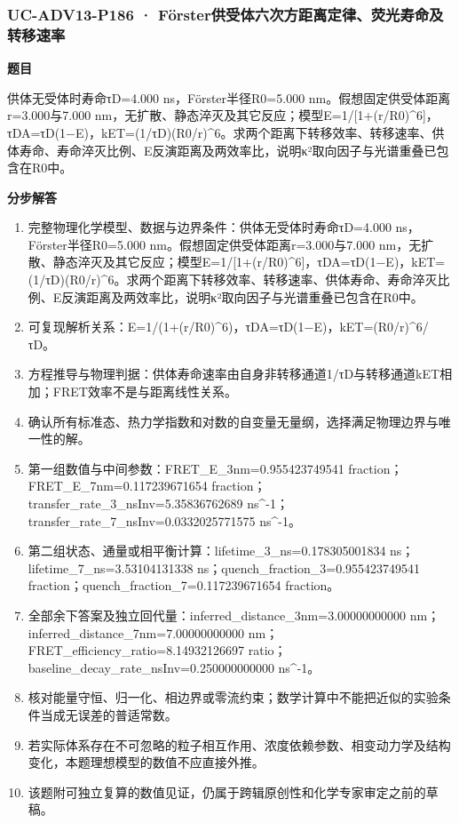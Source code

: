 \documentclass[UTF8,11pt,a4paper]{ctexart}
\begin{document}
\subsubsection*{UC-ADV13-P186 · Förster供受体六次方距离定律、荧光寿命及转移速率}
\noindent\textbf{题目}\par
供体无受体时寿命τD=4.000 ns，Förster半径R0=5.000 nm。假想固定供受体距离r=3.000与7.000 nm，无扩散、静态淬灭及其它反应；模型E=1/[1+(r/R0)\textasciicircum{}6]，τDA=τD(1−E)，kET=(1/τD)(R0/r)\textasciicircum{}6。求两个距离下转移效率、转移速率、供体寿命、寿命淬灭比例、E反演距离及两效率比，说明κ²取向因子与光谱重叠已包含在R0中。\par
\medskip\noindent\textbf{分步解答}
\begin{enumerate}
\item 完整物理化学模型、数据与边界条件：供体无受体时寿命τD=4.000 ns，Förster半径R0=5.000 nm。假想固定供受体距离r=3.000与7.000 nm，无扩散、静态淬灭及其它反应；模型E=1/[1+(r/R0)\textasciicircum{}6]，τDA=τD(1−E)，kET=(1/τD)(R0/r)\textasciicircum{}6。求两个距离下转移效率、转移速率、供体寿命、寿命淬灭比例、E反演距离及两效率比，说明κ²取向因子与光谱重叠已包含在R0中。
\item 可复现解析关系：E=1/(1+(r/R0)\textasciicircum{}6)，τDA=τD(1−E)，kET=(R0/r)\textasciicircum{}6/τD。
\item 方程推导与物理判据：供体寿命速率由自身非转移通道1/τD与转移通道kET相加；FRET效率不是与距离线性关系。
\item 确认所有标准态、热力学指数和对数的自变量无量纲，选择满足物理边界与唯一性的解。
\item 第一组数值与中间参数：FRET\_E\_3nm=0.955423749541 fraction；FRET\_E\_7nm=0.117239671654 fraction；transfer\_rate\_3\_nsInv=5.35836762689 ns\textasciicircum{}-1；transfer\_rate\_7\_nsInv=0.0332025771575 ns\textasciicircum{}-1。
\item 第二组状态、通量或相平衡计算：lifetime\_3\_ns=0.178305001834 ns；lifetime\_7\_ns=3.53104131338 ns；quench\_fraction\_3=0.955423749541 fraction；quench\_fraction\_7=0.117239671654 fraction。
\item 全部余下答案及独立回代量：inferred\_distance\_3nm=3.00000000000 nm；inferred\_distance\_7nm=7.00000000000 nm；FRET\_efficiency\_ratio=8.14932126697 ratio；baseline\_decay\_rate\_nsInv=0.250000000000 ns\textasciicircum{}-1。
\item 核对能量守恒、归一化、相边界或零流约束；数学计算中不能把近似的实验条件当成无误差的普适常数。
\item 若实际体系存在不可忽略的粒子相互作用、浓度依赖参数、相变动力学及结构变化，本题理想模型的数值不应直接外推。
\item 该题附可独立复算的数值见证，仍属于跨辑原创性和化学专家审定之前的草稿。
\end{enumerate}
\end{document}
